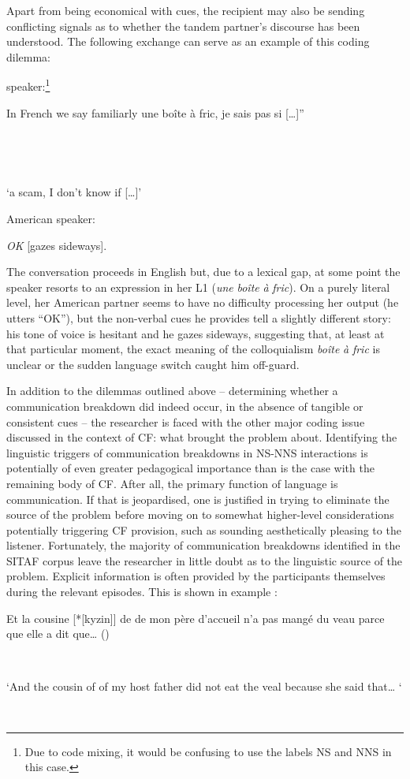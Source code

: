 \documentclass[output=paper,colorlinks,citecolor=brown,modfonts,nonflat]{../langscibook}
\begin{document}
Apart from being economical with cues, the recipient may also be sending conflicting signals as to whether the tandem partner’s discourse has been understood. The following exchange can serve as an example of this coding dilemma: 

\ea\label{ex:scheuer:17}
\parbox{3cm}{ speaker:\footnote{{Due to code mixing, it would be confusing to use the labels} {{NS} }{and} {{NNS}} {in this case.}}} \parbox[t]{8cm}{ {In} {French} {we} {say} {familiarly} une boîte à fric, {je} {sais}  {pas}  {si} [{…}]”}\\\smallskip
\parbox{3cm}{~} ‘a scam, I don’t know if […]’\\
\parbox{3cm}{American speaker:} \textit{OK} [gazes sideways].
\z

The conversation proceeds in English but, due to a lexical gap, at some point the  speaker resorts to an expression in her L1 (\textit{une} \textit{boîte} \textit{à} \textit{fric}). On a purely literal level, her American partner seems to have no difficulty processing her output (he utters “OK”), but the non-verbal cues he provides tell a slightly different story: his tone of voice is hesitant and he gazes sideways, suggesting that, at least at that particular moment, the exact meaning of the colloquialism \textit{boîte} \textit{à} \textit{fric} is unclear or the sudden language switch caught him off-guard.

In addition to the dilemmas outlined above – determining whether a communication breakdown did indeed occur, in the absence of tangible or consistent cues – the researcher is faced with the other major coding issue discussed in the context of CF: what brought the problem about. Identifying the linguistic triggers of communication breakdowns in NS-NNS interactions is potentially of even greater pedagogical importance than is the case with the remaining body of CF. After all, the primary function of language is communication. If that is jeopardised, one is justified in trying to eliminate the source of the problem before moving on to somewhat higher-level considerations potentially triggering CF provision, such as sounding aesthetically pleasing to the listener. Fortunately, the majority of communication breakdowns identified in the SITAF corpus leave the researcher in little doubt as to the linguistic source of the problem. Explicit information is often provided by the participants themselves during the relevant episodes. This is shown in example :

\ea\label{ex:scheuer:18}
{\NNS} \parbox[t]{10cm}{{Et} {la} {cousine} [*[kyzin]] {de} {de} {mon} {père} {d'accueil} {n'a} {pas} {mangé} {du} {veau} {parce} {que} {elle} {a} {dit} {que…}  ()}\\\smallskip
{\TRS} \parbox[t]{10cm}{‘And the cousin of of my host father did not eat the veal because she said that… ‘}\\\smallskip
\end{document}
